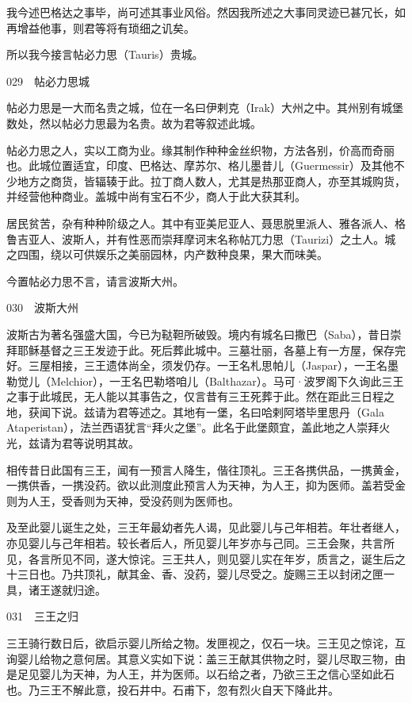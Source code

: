 \documentclass[12pt,UTF8]{ctexbook}
\begin{document}
我今述巴格达之事毕，尚可述其事业风俗。然因我所述之大事同灵迹已甚冗长，如再增益他事，则君等将有琐细之讥矣。

所以我今接言帖必力思（Tauris）贵城。





029　帖必力思城

帖必力思是一大而名贵之城，位在一名曰伊剌克（Irak）大州之中。其州别有城堡数处，然以帖必力思最为名贵。故为君等叙述此城。

帖必力思之人，实以工商为业。缘其制作种种金丝织物，方法各别，价高而奇丽也。此城位置适宜，印度、巴格达、摩苏尔、格儿墨昔儿（Guermessir）及其他不少地方之商货，皆辐辏于此。拉丁商人数人，尤其是热那亚商人，亦至其城购货，并经营他种商业。盖城中尚有宝石不少，商人于此大获其利。

居民贫苦，杂有种种阶级之人。其中有亚美尼亚人、聂思脱里派人、雅各派人、格鲁吉亚人、波斯人，并有性恶而崇拜摩诃末名称帖兀力思（Taurizi）之土人。城之四围，绕以可供娱乐之美丽园林，内产数种良果，果大而味美。

今置帖必力思不言，请言波斯大州。





030　波斯大州

波斯古为著名强盛大国，今已为鞑靼所破毁。境内有城名曰撒巴（Saba），昔日崇拜耶稣基督之三王发迹于此。死后葬此城中。三墓壮丽，各墓上有一方屋，保存完好。三屋相接，三王遗体尚全，须发仍存。一王名札思帕儿（Jaspar），一王名墨勒觉儿（Melchior），一王名巴勒塔咱儿（Balthazar）。马可·波罗阁下久询此三王之事于此城民，无人能以其事告之，仅言昔有三王死葬于此。然在距此三日程之地，获闻下说。兹请为君等述之。其地有一堡，名曰哈剌阿塔毕里思丹（Gala Ataperistan），法兰西语犹言“拜火之堡”。此名于此堡颇宜，盖此地之人崇拜火光，兹请为君等说明其故。

相传昔日此国有三王，闻有一预言人降生，偕往顶礼。三王各携供品，一携黄金，一携供香，一携没药。欲以此测度此预言人为天神，为人王，抑为医师。盖若受金则为人王，受香则为天神，受没药则为医师也。

及至此婴儿诞生之处，三王年最幼者先人谒，见此婴儿与己年相若。年壮者继人，亦见婴儿与己年相若。较长者后人，所见婴儿年岁亦与己同。三王会聚，共言所见，各言所见不同，遂大惊诧。三王共人，则见婴儿实在年岁，质言之，诞生后之十三日也。乃共顶礼，献其金、香、没药，婴儿尽受之。旋赐三王以封闭之匣一具，诸王遂就归途。





031　三王之归

三王骑行数日后，欲启示婴儿所给之物。发匣视之，仅石一块。三王见之惊诧，互询婴儿给物之意何居。其意义实如下说：盖三王献其供物之时，婴儿尽取三物，由是足见婴儿为天神，为人王，并为医师。以石给之者，乃欲三王之信心坚如此石也。乃三王不解此意，投石井中。石甫下，忽有烈火自天下降此井。
\end{document}
